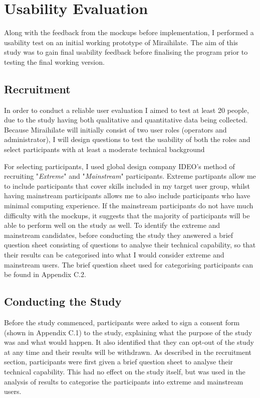 \chapter{Usability Evaluation}

Along with the feedback from the mockups before implementation, I performed a usability test on an initial working prototype of Miraihilate. The aim of this study was to gain final usability feedback before finalising the program prior to testing the final working version.

\section{Recruitment}

In order to conduct a reliable user evaluation I aimed to test at least 20 people, due to the study having both qualitative and quantitative data being collected. Because Miraihilate will initially consist of two user roles (operators and administrator), I will design questions to test the usability of both the roles and select participants with at least a moderate technical background

\vspace{0.5cm}

For selecting participants, I used global design company IDEO's method of recruiting "\textit{Extreme}" and "\textit{Mainstream}" participants. Extreme partipants allow me to include participants that cover skills included in my target user group, whilst having mainstream participants allows me to also include participants who have minimal computing experience. If the mainstream participants do not have much difficulty with the mockups, it suggests that the majority of participants will be able to perform well on the study as well. To identify the extreme and mainstream candidates, before conducting the study they answered a brief question sheet consisting of questions to analyse their technical capability, so that their results can be categorised into what I would consider extreme and mainstream users. The brief question sheet used for categorising participants can be found in Appendix C.2.

\section{Conducting the Study}

Before the study commenced, participants were asked to sign a consent form (shown in Appendix C.1) to the study, explaining what the purpose of the study was and what would happen. It also identified that they can opt-out of the study at any time and their results will be withdrawn.
As described in the recruitment section, participants were first given a brief question sheet to analyse their technical capability. This had no effect on the study itself, but was used in the analysis of results to categorise the participants into extreme and mainstream users.

